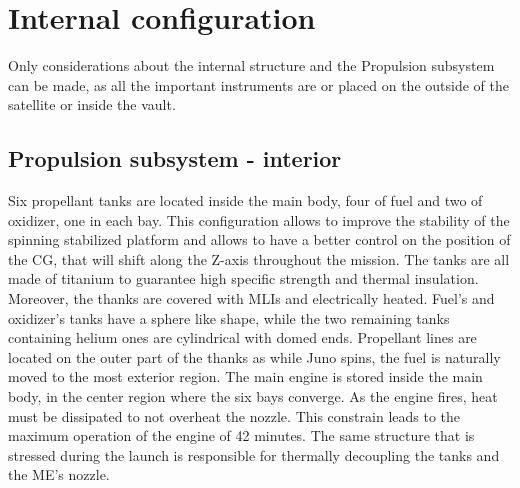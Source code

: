 \section{Internal configuration}
\label{sec:internal_config}

Only considerations about the internal structure and the Propulsion subsystem can be made, as all the important instruments are or placed on the outside of the satellite or inside the vault.

\subsection{Propulsion subsystem - interior} 
\label{subsec:prop_sub_int}

Six propellant tanks are located inside the main body, four of fuel and two of oxidizer, one in each bay. This configuration allows to improve the stability of the spinning stabilized platform and allows to have a better control on the position of the CG, that will shift along the Z-axis throughout the mission. The tanks are all made of titanium to guarantee high specific strength and thermal insulation.\cite{LL_early_cruise} Moreover, the thanks are covered with MLIs and electrically heated. Fuel's and oxidizer's tanks have a sphere like shape, while the two remaining tanks containing helium ones are cylindrical with domed ends. Propellant lines are located on the outer part of the thanks as while Juno spins, the fuel is naturally moved to the most exterior region. The main engine is stored inside the main body, in the center region where the six bays converge.\cite{Leros}\cite{Juno_launch} As the engine fires, heat must be dissipated to not overheat the nozzle. This constrain leads to the maximum operation of the engine of 42 minutes.\cite{Leros} The same structure that is stressed during the launch is responsible for thermally decoupling the tanks and the ME's nozzle. 

